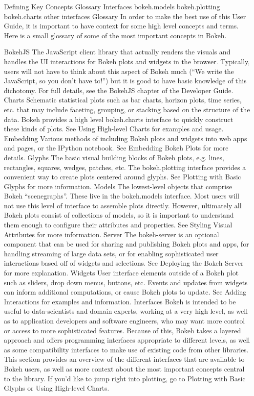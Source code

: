 Defining Key Concepts
Glossary
Interfaces
bokeh.models
bokeh.plotting
bokeh.charts
other interfaces
Glossary
In order to make the best use of this User Guide, it is important to have context for some high level concepts and terms. Here is a small glossary of some of the most important concepts in Bokeh.

BokehJS
The JavaScript client library that actually renders the visuals and handles the UI interactions for Bokeh plots and widgets in the browser. Typically, users will not have to think about this aspect of Bokeh much (“We write the JavaScript, so you don’t have to!”) but it is good to have basic knowledge of this dichotomy. For full details, see the BokehJS chapter of the Developer Guide.
Charts
Schematic statistical plots such as bar charts, horizon plots, time series, etc. that may include faceting, grouping, or stacking based on the structure of the data. Bokeh provides a high level bokeh.charts interface to quickly construct these kinds of plots. See Using High-level Charts for examples and usage.
Embedding
Various methods of including Bokeh plots and widgets into web apps and pages, or the IPython notebook. See Embedding Bokeh Plots for more details.
Glyphs
The basic visual building blocks of Bokeh plots, e.g. lines, rectangles, squares, wedges, patches, etc. The bokeh.plotting interface provides a convenient way to create plots centered around glyphs. See Plotting with Basic Glyphs for more information.
Models
The lowest-level objects that comprise Bokeh “scenegraphs”. These live in the bokeh.models interface. Most users will not use this level of interface to assemble plots directly. However, ultimately all Bokeh plots consist of collections of models, so it is important to understand them enough to configure their attributes and properties. See Styling Visual Attributes for more information.
Server
The bokeh-server is an optional component that can be used for sharing and publishing Bokeh plots and apps, for handling streaming of large data sets, or for enabling sophisticated user interactions based off of widgets and selections. See Deploying the Bokeh Server for more explanation.
Widgets
User interface elements outside of a Bokeh plot such as sliders, drop down menus, buttons, etc. Events and updates from widgets can inform additional computations, or cause Bokeh plots to update. See Adding Interactions for examples and information.
Interfaces
Bokeh is intended to be useful to data-scientists and domain experts, working at a very high level, as well as to application developers and software engineers, who may want more control or access to more sophisticated features. Because of this, Bokeh takes a layered approach and offers programming interfaces appropriate to different levels, as well as some compatibility interfaces to make use of existing code from other libraries. This section provides an overview of the different interfaces that are available to Bokeh users, as well as more context about the most important concepts central to the library. If you’d like to jump right into plotting, go to Plotting with Basic Glyphs or Using High-level Charts.

